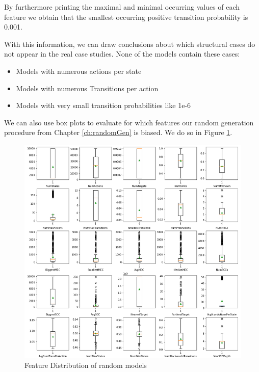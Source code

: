 By furthermore printing the maximal and minimal occurring values of each feature we obtain that the smallest occurring positive transition probability is 0.001.

With this information, we can draw conclusions about which structural cases do not appear in the real case studies. 
None of the models contain these cases:
\begin{itemize}
    \item Models with numerous actions per state
    \item Models with numerous Transitions per action
    \item Models with very small transition probabilities like 1e-6
\end{itemize}

We can also use box plots to evaluate for which features our random generation procedure from Chapter \ref{ch:randomGen} is biased.
We do so in Figure \ref{fig:Random_FeatureDistribution}.
\begin{figure}[t]
    \centering
    \includegraphics[width=1\textwidth]{figures/RandomRandom_FeatureDistribution.png}
    \caption[Feature Distribution of random models]{
        Feature Distribution of random models
    }
    \label{fig:Random_FeatureDistribution}
\end{figure}

